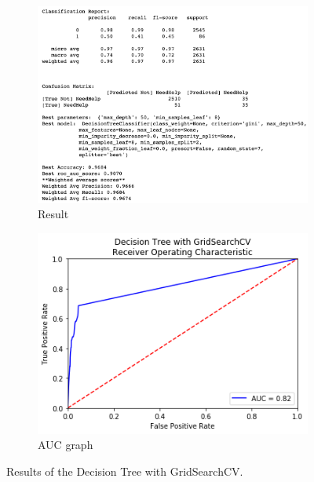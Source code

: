 \documentclass[11pt]{article}
\begin{document}
\begin{itemize}
%
\begin{figure}[h!]
\centering
\begin{subfigure}{0.6\textwidth}
         \centering
         \includegraphics[width=\textwidth]{dtree_gridcv.png}
         \caption{Result}
         \label{fig:dtree_cv_report}
\end{subfigure}
\hfill
\begin{subfigure}{0.38\textwidth}
         \centering
         \includegraphics[width=\textwidth]{dtree_gridcv_auc.png}
         \caption{AUC graph}
         \label{fig:dtree_cv_auc}
\end{subfigure}
\caption{Results of the Decision Tree with GridSearchCV.}
\label{fig:dtree_gridcv}
\end{figure}



\end{itemize}
\end{document}
